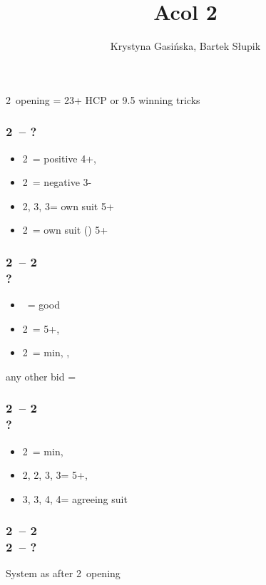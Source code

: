 \documentclass[12pt, a4paper]{article}
\title{Acol 2\clubsuit}
\author{Krystyna Gasińska, Bartek Słupik}
\begin{document}
\maketitle


2\clubs\ opening = 23+ HCP or 9.5 winning tricks

\subsubsection*{2\clubs\ -- ?}
\begin{itemize}
    \item 2\diams\ = positive 4+, \gf
    \item 2\hearts\ = negative 3-
    \item 2\spades, 3\clubs, 3\diams = own suit 5+
    \item 2\nt\ = own suit (\hearts) 5+
\end{itemize}

\subsubsection*{2\clubs\ -- 2\hearts \\ ?}
\begin{itemize}
    \item \pass\ = good \hearts
    \item 2\spades\ = 5+, \fonce
    \item 2\nt\ = min, \bal, \nf
\end{itemize}

any other bid = \gf

\subsubsection*{2\clubs\ -- 2\diams \\ ?}
\begin{itemize}
    \item 2\nt\ = min, \bal
    \item 2\hearts, 2\spades, 3\clubs, 3\diams = 5+, \unbal
    \item 3\hearts, 3\spades, 4\clubs, 4\diams = agreeing suit
\end{itemize}

\subsubsection*{2\clubs\ -- 2\diams \\ 2\nt\ -- ?}
System as after 2\nt\ opening
\end{document}
